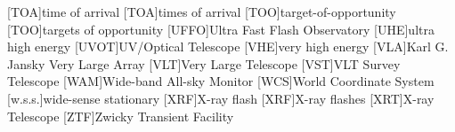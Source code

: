 \begin{acronym}
[TOA]{time of arrival}
[TOA]{times of arrival}
[TOO]{target\nobreakdashes-of\nobreakdashes-opportunity}
[TOO]{targets of opportunity}
[UFFO]{Ultra Fast Flash Observatory}
[UHE]{ultra high energy}
[UVOT]{UV/Optical Telescope}
[VHE]{very high energy}
[VLA]{Karl G. Jansky Very Large Array}
[VLT]{Very Large Telescope}
[VST]{\acs{VLT} Survey Telescope}
[WAM]{Wide\nobreakdashes-band All\nobreakdashes-sky Monitor}
[WCS]{World Coordinate System}
[w.s.s.]{wide\nobreakdashes-sense stationary}
[XRF]{X\nobreakdashes-ray flash}
[XRF]{X\nobreakdashes-ray flashes}
[XRT]{X\nobreakdashes-ray Telescope}
[ZTF]{Zwicky Transient Facility}
\end{acronym}
